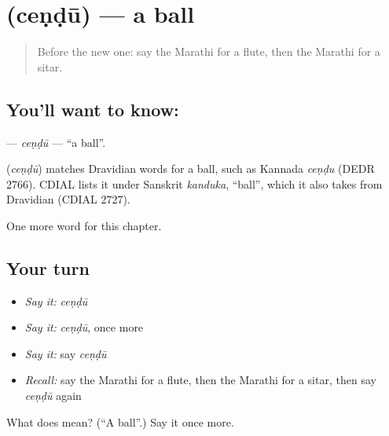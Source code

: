 \section[\texorpdfstring{\mr{चेंडू} (ceṇḍū)}{चेंडू (ceṇḍū)}]{ (ceṇḍū) — a ball}

\label{lesson:MR-C268-cendu}



\begin{quote}
Before the new one: say the Marathi for a flute, then the Marathi for a sitar.
\end{quote}

\subsection*{You'll want to know: }
\textbf{} — \emph{ceṇḍū} — \textquotedblleft{}a ball\textquotedblright{}.

\begin{cousinweb}
\textbf{} (\emph{ceṇḍū}) matches Dravidian words for a ball, such as Kannada \emph{ceṇḍu} (DEDR 2766). CDIAL lists it under Sanskrit \emph{kanduka}, \textquotedblleft{}ball\textquotedblright{}, which it also takes from Dravidian (CDIAL 2727).
\end{cousinweb}

\begin{grammarlens}[title={What you've built}]
One more word for this chapter.
\end{grammarlens}

\subsection*{Your turn}
\begin{itemize}
\raggedright
  \item \emph{Say it:} \emph{ceṇḍū}
  \item \emph{Say it:} \emph{ceṇḍū}, once more
  \item \emph{Say it:} say \emph{ceṇḍū}
  \item \emph{Recall:} say the Marathi for a flute, then the Marathi for a sitar, then say \emph{ceṇḍū} again
\end{itemize}

\begin{tcolorbox}[breakable,colback=teal!4,colframe=teal!35!black,title={Before you move on}]
What does  mean? (\textquotedblleft{}A ball\textquotedblright{}.) Say it once more.
\end{tcolorbox}
